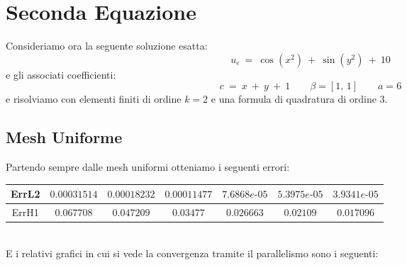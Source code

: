 \documentclass[12pt,a4paper]{report}
\theoremstyle{theorem}
\theoremstyle{theorem}
\theoremstyle{definition}
\begin{document}
\section{Seconda Equazione}
Consideriamo ora la seguente soluzione esatta:
\[ u_e \ = \ \cos{(x^2)} \ + \ \sin{(y^2)} \ + \ 10 \]
e gli associati coefficienti:
\[ c \ = \ x \ + \ y \ + \ 1 \qquad \beta = [1, \, 1] \qquad a = 6 \]
e risolviamo con elementi finiti di ordine $k = 2$ e una formula di quadratura di ordine $3$. 

\subsection{Mesh Uniforme}
Partendo sempre dalle mesh uniformi otteniamo i seguenti errori:
\begin{table}[!h]
\centering
\begin{tabular}{ | c | c | c | c | c | c | c | }
\hline
ErrL2	&	$0.00031514$ & $0.00018232$ & $0.00011477$ & $7.6868e\text{-}05$ & $5.3975e\text{-}05$ & $3.9341e\text{-}05$ \\ \hline 
ErrH1	&	$0.067708$ &	$0.047209$	 & $0.03477$	 & $0.026663$ & $0.02109$ & $0.017096$ \\ \hline 
\end{tabular}
\end{table}
\hfill \\
E i relativi grafici in cui si vede la convergenza tramite il parallelismo sono i seguenti:
\end{document}
